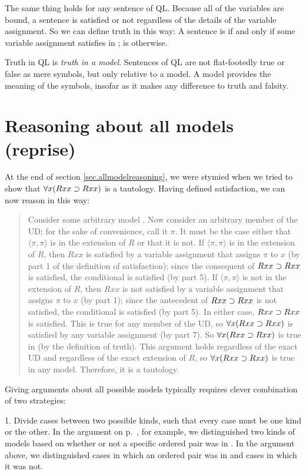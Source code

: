 The same thing holds for any sentence of QL. Because all of the variables are bound, a sentence is satisfied or not regardless of the details of the variable assignment. So we can define truth in this way: A sentence \metaA{} is   if and only if some variable assignment satisfies \metaA{} in ; \metaA{} is   otherwise.

Truth in QL is \emph{truth in a model}. Sentences of QL are not flat-footedly true or false as mere symbols, but only relative to a model. A model provides the meaning of the symbols, insofar as it makes any difference to truth and falsity.


\section{Reasoning about all models (reprise)}
At the end of section \ref{sec.allmodelreasoning}, we were stymied when we tried to show that $\forall x(Rxx\supset Rxx)$ is a tautology. Having defined satisfaction, we can now reason in this way:
\begin{quote}
Consider some arbitrary model . Now consider an arbitrary member of the UD; for the sake of convenience, call it $\pi$. It must be the case either that $\langle\pi,\pi\rangle$ is in the extension of $R$ or that it is not. If $\langle\pi,\pi\rangle$ is in the extension of $R$, then $Rxx$ is satisfied by a variable assignment that assigns $\pi$ to $x$ (by part 1 of the definition of  {satisfaction}); since the consequent of $Rxx\supset Rxx$ is satisfied, the conditional is satisfied (by part 5). If $\langle\pi,\pi\rangle$ is not in the extension of $R$, then $Rxx$ is not satisfied by a variable assignment that assigns $\pi$ to $x$ (by part 1); since the antecedent of $Rxx\supset Rxx$ is not satisfied, the conditional is satisfied (by part 5). In either case, $Rxx\supset Rxx$ is satisfied. This is true for any member of the UD, so $\forall x(Rxx \supset Rxx)$ is satisfied by any variable assignment (by part 7). So $\forall x(Rxx \supset Rxx)$ is true in  (by the definition of {truth}). This argument holds regardless of the exact UD and regardless of the exact extension of $R$, so $\forall x(Rxx \supset Rxx)$ is true in any model. Therefore, it is a tautology.
\end{quote}

Giving arguments about all possible models typically requires clever combination of two strategies:

1. Divide cases between two possible kinds, such that every case must be one kind or the other.  In the argument on p.~\pageref{allmodels1}, for example, we distinguished two kinds of models based on whether or not a specific ordered pair was in . In the argument above, we distinguished cases in which an ordered pair was in  and cases in which it was not.

